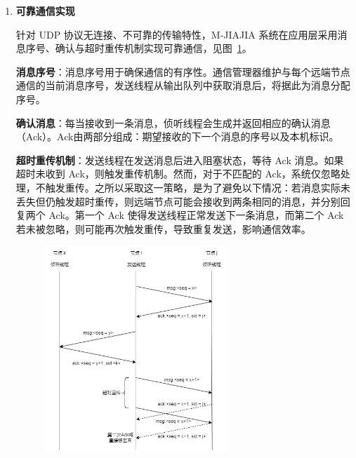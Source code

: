 {\begin{enumerate}[label=\arabic*.]
\begin{algorithm}[H]
\begin{algorithmic}[1]
                \State $msg\_ptr \gets$ 
                \State {}
    
                \State {}
                \State \textbf{return}
             \EndProcedure
        \end{algorithmic}
    \end{algorithm}

    \item \textbf{可靠通信实现}
    
    针对 UDP 协议无连接、不可靠的传输特性，M-JIAJIA 系统在应用层采用消息序号、确认与超时重传机制实现可靠通信，见图~\ref{fig:mjiajia-reliable-comm}。
    
    \textbf{消息序号}：消息序号用于确保通信的有序性。通信管理器维护与每个远端节点通信的当前消息序号，发送线程从输出队列中获取消息后，将据此为消息分配序号。

    \textbf{确认消息}：每当接收到一条消息，侦听线程会生成并返回相应的确认消息（Ack）。Ack由两部分组成：期望接收的下一个消息的序号以及本机标识。

    \textbf{超时重传机制}：发送线程在发送消息后进入阻塞状态，等待 Ack 消息。如果超时未收到 Ack，则触发重传机制。然而，对于不匹配的 Ack，系统仅忽略处理，不触发重传。之所以采取这一策略，是为了避免以下情况：若消息实际未丢失但仍触发超时重传，则远端节点可能会接收到两条相同的消息，并分别回复两个 Ack。第一个 Ack 使得发送线程正常发送下一条消息，而第二个 Ack 若未被忽略，则可能再次触发重传，导致重复发送，影响通信效率。

    \begin{figure}[H]
        \centering
        \includegraphics[width=0.65\textwidth]{Img/M-JIAJIA-reliable-comm.png}
        \label{fig:mjiajia-reliable-comm}
    \end{figure}
    

\end{enumerate}}

